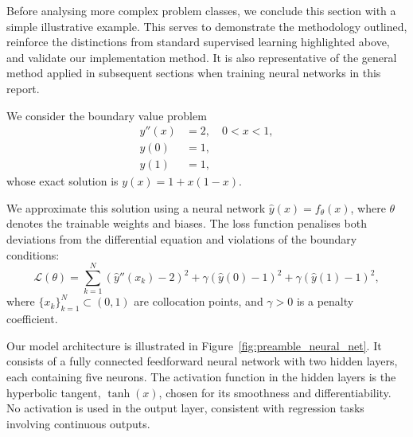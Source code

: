 Before analysing more complex problem classes, we conclude this section with a simple illustrative 
example. This serves to demonstrate the methodology outlined, reinforce the distinctions 
from standard supervised learning highlighted above, and validate our implementation method. 
It is also representative of the general method applied in subsequent sections when training 
neural networks in this report.

We consider the boundary value problem
\[
\begin{aligned}
    y''(x) &= 2, \quad 0 < x < 1, \\
    y(0) &= 1, \\
    y(1) &= 1,
\end{aligned}
\]
whose exact solution is \( y(x) = 1 + x(1 - x) \).

We approximate this solution using a neural network \( \hat{y}(x) = f_\theta(x) \), where 
\( \theta \) denotes the trainable weights and biases. The loss function penalises both 
deviations from the differential equation and violations of the boundary conditions:
\begin{equation}
\label{eq:prelim_loss_func}
\mathcal{L}(\theta) = \sum_{k=1}^N \left( \hat{y}''(x_k) - 2 \right)^2 
+ \gamma \left( \hat{y}(0) - 1 \right)^2 
+ \gamma \left( \hat{y}(1) - 1 \right)^2,
\end{equation}
where \( \{x_k\}_{k=1}^N \subset (0,1) \) are collocation points, and \( \gamma > 0 \) is a penalty 
coefficient.

Our model architecture is illustrated in Figure~\ref{fig:preamble_neural_net}. It consists of a 
fully connected feedforward neural network with two hidden layers, each containing five neurons. 
The activation function in the hidden layers is the hyperbolic tangent, \( \tanh(x) \), chosen for 
its smoothness and differentiability. No activation is used in the output layer, consistent 
with regression tasks involving continuous outputs.

